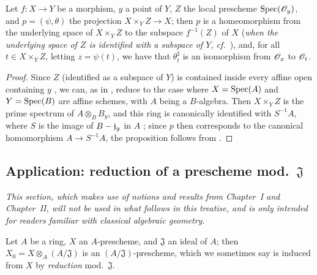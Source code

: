 \begin{proposition}[3.6.5]
\label{I.3.6.5}
Let $f:X\to Y$ be a morphism, $y$ a point of $Y$, $Z$ the local prescheme $\operatorname{Spec}(\mathscr{O}_y)$, and $p=(\psi,\theta)$ the projection $X\times_Y Z\to X$; then $p$ is a homeomorphism from the underlying space of $X\times_Y Z$ to the subspace $f^{-1}(Z)$ of $X$ (\emph{when the underlying space of $Z$ is identified with a subspace of $Y$, cf.~}), and, for all $t\in X\times_Y Z$, letting $z=\psi(t)$, we have that $\theta_t^\sharp$ is an isomorphism from $\mathscr{O}_x$ to $\mathscr{O}_t$.
\end{proposition}

\begin{proof}
Since $Z$ (identified as a subspace of $Y$) is contained inside every affine open containing $y$ , we can, as in , reduce to the case where $X=\operatorname{Spec}(A)$ and $Y=\operatorname{Spec}(B)$ are affine schemes, with $A$ being a $B$-algebra.
Then $X\times_Y Z$ is the prime spectrum of $A\otimes_B B_y$, and this ring is canonically identified with $S^{-1}A$, where $S$ is the image of $B-\mathfrak{j}_y$ in $A$ ; since $p$ then corresponds to the canonical homomorphism $A\to S^{-1}A$, the proposition follows from .
\end{proof}

\subsection{Application: reduction of a prescheme mod.~$\mathfrak{J}$}
\label{subsection:I.3.7}

\emph{This section, which makes use of notions and results from Chapter~I and Chapter~II, will not be used in what follows in this treatise, and is only intended for readers familiar with classical algebraic geometry}.

\begin{env}[3.7.1]
\label{I.3.7.1}
Let $A$ be a ring, $X$ an $A$-prescheme, and $\mathfrak{J}$ an ideal of $A$; then $X_0=X\otimes_A(A/\mathfrak{J})$ is an $(A/\mathfrak{J})$-prescheme, which we sometimes say is induced from $X$ by \emph{reduction} mod.~$\mathfrak{J}$.
\end{env}

